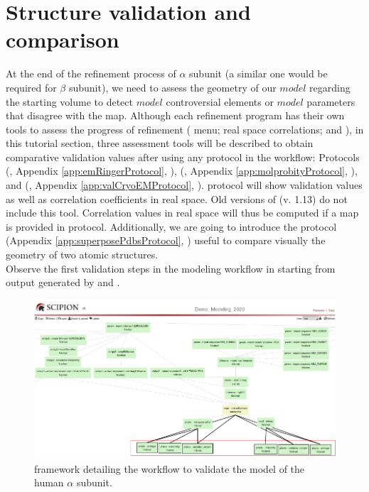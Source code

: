 \section{Structure validation and comparison}
\label{seq:structurevalidation}
 At the end of the refinement process of  $\alpha$ subunit (a similar one would be required for $\beta$ subunit), we need to assess the geometry of our $model$ regarding the starting volume to detect $model$ controversial elements or $model$ parameters that disagree with the map. Although each refinement program has their own tools to assess the progress of refinement (\coot {} menu; \phenix {} real space correlations;  {} and ), in this tutorial section, three assessment tools will be described to obtain comparative validation values after using any protocol in the workflow:  Protocols \emringer (, Appendix \ref{app:emRingerProtocol}, \citep{barad2015}), \molprobity (, Appendix \ref{app:molprobityProtocol}, \citep{davis2004}), and \validationCryoEM (, Appendix \ref{app:valCryoEMProtocol}, \citep{afonine2018b}). \validationCryoEM protocol will show \molprobity validation values as well as correlation coefficients in real space. Old versions of \phenix (v. 1.13) do not include this tool. Correlation values in real space will thus be computed if a map is provided in \molprobity protocol. Additionally, we are going to introduce the protocol  (Appendix \ref{app:superposePdbsProtocol}, \citep{zwartUrl}) useful to compare visually the geometry of two atomic structures.\\
 
 Observe the first validation steps in the modeling \scipion workflow in  starting from output  generated by \phenix {} and .

 \begin{figure}[H]
  \centering 
  \captionsetup{width=.9\linewidth} 
  \includegraphics[width=1\textwidth]{Images/Fig69}
  \caption{\scipion framework detailing the workflow to validate the model of the human  $\alpha$ subunit.}
  \label{fig:scipion_workflow_validation}
  \end{figure}
 
